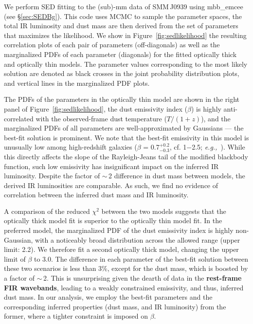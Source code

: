 \documentclass[iop]{emulateapj}
\newcommand{\eg}{{\sl e.g.,~}}
\begin{document}

\appendix
We perform SED fitting to the (sub)-mm data of SMM\,J0939 using {\sc mbb\_emcee} (see \S \ref{sec:SEDBg}). This code uses MCMC to sample the parameter spaces, the total IR luminosity and dust mass are then derived from the set of parameters that maximizes the likelihood.
We show in Figure~\ref{fig:sedlikelihood} the resulting correlation plots of each pair of parameters (off-diagonals) as well as the marginalized PDFs of each parameter (diagonals) for the fitted optically thick and optically thin models.
The parameter values corresponding to the most likely solution are denoted as black crosses in the joint probability distribution plots, and vertical lines in the marginalized PDF plots. \par

The PDFs of the parameters in the optically thin model are shown in the right panel of Figure~\ref{fig:sedlikelihood}, the dust emissivity index ($\beta$) is highly anti-correlated with the observed-frame dust temperature ($T/(1+z)$), and the marginalized PDFs of all parameters are well-approximated by Gaussians --- the best-fit solution is prominent.
We note that the best-fit emissivity in this model is unusually low among high-redshift galaxies ($\beta$ = 0.7$^{+0.2}_{-0.3}$, cf. 1$-$2.5; \eg \citealt[][and references therein]{Casey12a}). While this directly affects the slope of the Rayleigh-Jeans tail of the modified blackbody function, such low emissivity has insignificant impact on the inferred IR luminosity.
Despite the factor of $\sim$\,2 difference
in dust mass
between models, the derived IR luminosities are comparable. As such, we find no evidence of correlation between the inferred dust mass and IR luminosity. 

A comparison of the reduced $\chi^2$ between the two models suggests that the optically thick model fit is superior to the optically thin model fit. In the preferred model, the marginalized PDF of the dust emissivity index is highly non-Gaussian, with a noticeably broad distribution across
the allowed range (upper limit: 2.2). We therefore fit a second optically thick model, changing the upper limit of $\beta$ to 3.0. The difference in each
parameter of the best-fit solution between these two scenarios is less than 3\%, except for the dust mass, which is boosted by a factor of $\sim$\,2. This is
unsurprising given the dearth of data in the {\bf rest-frame FIR wavebands}, leading to a weakly constrained emissivity, and thus, inferred dust mass.
In our analysis, we employ the best-fit parameters and the corresponding inferred properties (dust mass, and IR luminosity) from the former, where a tighter constraint is imposed on $\beta$.
\end{document}
